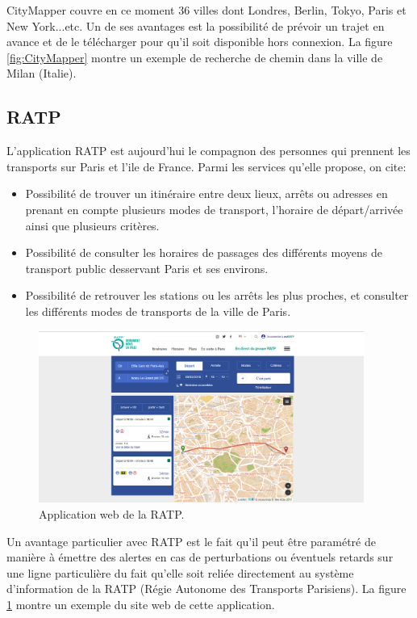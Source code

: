 CityMapper couvre en ce moment 36 villes dont Londres, Berlin, Tokyo, Paris et New York...etc.  Un de ses avantages est la possibilité de prévoir un trajet en avance et de le télécharger pour qu'il soit disponible hors connexion.
La figure \ref{fig:CityMapper} montre un exemple de recherche de chemin dans la ville de Milan (Italie).

\subsection{RATP}
L'application RATP est aujourd'hui le compagnon des personnes qui prennent les transports sur Paris et l'ile de France.
Parmi les services qu'elle propose, on cite:
\begin{itemize}
	\item Possibilité de trouver un itinéraire entre deux lieux, arrêts ou adresses en prenant en compte plusieurs modes de transport, l'horaire de départ/arrivée ainsi que plusieurs critères.
	\item Possibilité de consulter les horaires de passages des différents moyens de transport public desservant Paris et ses environs. 
	\item Possibilité de retrouver les stations ou les arrêts les plus proches, et consulter les différents modes de transports de la ville de Paris.
\end{itemize}

\begin{figure}[h!]
	\center
	\includegraphics[width=0.95\textwidth]{img/ratp.png}
	\caption{Application web de la RATP.}
	\label{fig:RATP}
\end{figure}
Un avantage particulier avec RATP est le fait qu'il peut être paramétré de manière à émettre des alertes en cas de perturbations ou éventuels retards sur une ligne particulière du fait qu'elle soit reliée directement au système d'information de la RATP (Régie Autonome des Transports Parisiens).
La figure \ref{fig:RATP} montre un exemple du site web de cette application.

